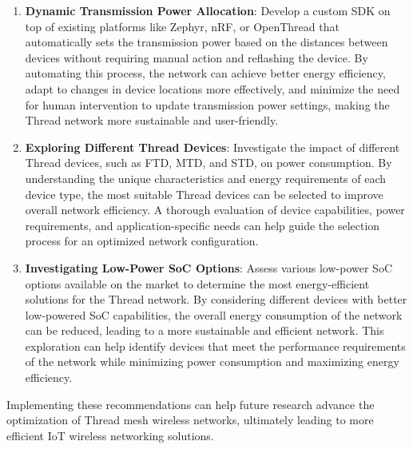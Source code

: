 \begin{enumerate}
    \item \textbf{Dynamic Transmission Power Allocation}: Develop a custom \gls{SDK} on top of existing platforms like Zephyr, \gls{nRF}, or OpenThread that automatically sets the transmission power based on the distances between devices without requiring manual action and reflashing the device. By automating this process, the network can achieve better energy efficiency, adapt to changes in device locations more effectively, and minimize the need for human intervention to update transmission power settings, making the Thread network more sustainable and user-friendly.
    \item \textbf{Exploring Different Thread Devices}: Investigate the impact of different Thread devices, such as \gls{FTD}, \gls{MTD}, and \gls{STD}, on power consumption. By understanding the unique characteristics and energy requirements of each device type, the most suitable Thread devices can be selected to improve overall network efficiency. A thorough evaluation of device capabilities, power requirements, and application-specific needs can help guide the selection process for an optimized network configuration.
    \item \textbf{Investigating Low-Power \gls{SoC} Options}: Assess various low-power \gls{SoC} options available on the market to determine the most energy-efficient solutions for the Thread network. By considering different devices with better low-powered \gls{SoC} capabilities, the overall energy consumption of the network can be reduced, leading to a more sustainable and efficient network. This exploration can help identify devices that meet the performance requirements of the network while minimizing power consumption and maximizing energy efficiency.
\end{enumerate}

Implementing these recommendations can help future research advance the optimization of Thread mesh wireless networks, ultimately leading to more efficient \gls{IoT} wireless networking solutions.
